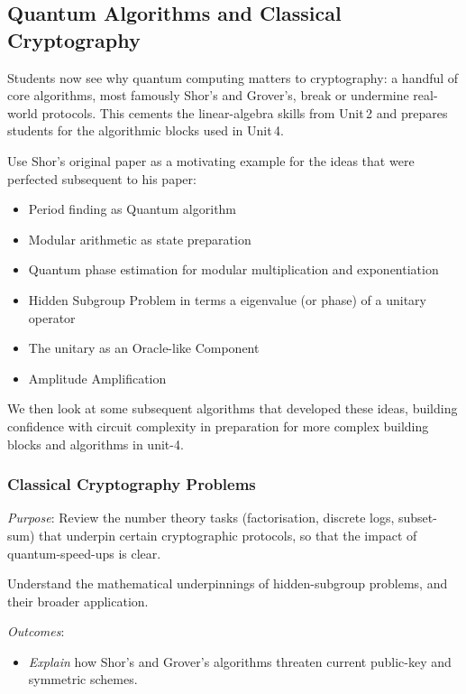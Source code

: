 \subsection{Quantum Algorithms and Classical Cryptography}

Students now see why quantum computing matters to cryptography:
a handful of core algorithms, most famously Shor's and Grover's, break or undermine real-world protocols. 
This cements the linear-algebra skills from Unit 2 and prepares students for the algorithmic blocks used in Unit 4.

Use Shor's original paper as a motivating example for the ideas that were perfected subsequent to his paper:
\begin{itemize}
	\item Period finding as Quantum algorithm
	\item Modular arithmetic as state preparation
	\item Quantum phase estimation for modular multiplication and exponentiation 
	\item Hidden Subgroup Problem in terms a eigenvalue (or phase) of a unitary operator
	\item The unitary as an Oracle-like Component
	\item Amplitude Amplification
\end{itemize}

We then look at some subsequent algorithms that developed these ideas, building confidence with circuit complexity in preparation for more
complex building blocks and algorithms in unit-4.


\subsubsection*{Classical Cryptography Problems}

\emph{Purpose}: Review the number theory tasks (factorisation, discrete logs, subset-sum) 
that underpin certain cryptographic protocols, so that the impact of quantum-speed-ups is clear.

Understand the mathematical underpinnings of hidden-subgroup problems, and their broader application.

\emph{Outcomes}:
\begin{itemize}
	\item \emph{Explain} how Shor's and Grover's algorithms threaten current public-key and symmetric schemes.
\end{itemize}


